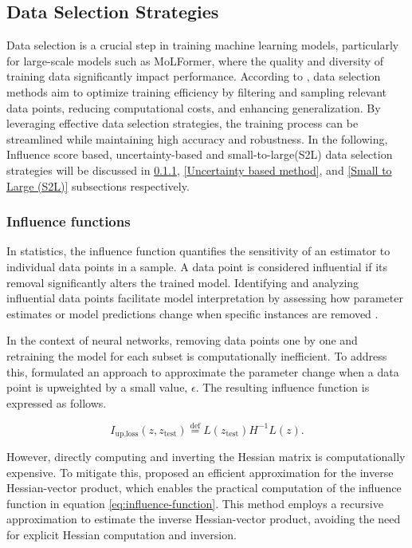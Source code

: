\documentclass[11pt]{article}
\begin{document}
\subsection{Data Selection Strategies}
\label{data-selection}
Data selection is a crucial step in training machine learning models, particularly for large-scale models such as MoLFormer, where the quality and diversity of training data significantly impact performance. According to \cite{albalak2023survey}, data selection methods aim to optimize training efficiency by filtering and sampling relevant data points, reducing computational costs, and enhancing generalization. By leveraging effective data selection strategies, the training process can be streamlined while maintaining high accuracy and robustness. In the following, Influence score based, uncertainty-based and small-to-large(S2L) data selection strategies will be discussed in \ref{Influence functions}, \ref{Uncertainty based method}, and \ref{Small to Large (S2L)} subsections respectively. 

\subsubsection{Influence functions}
\label{Influence functions}
In statistics, the influence function quantifies the sensitivity of an estimator to individual data points in a sample. A data point is considered influential if its removal significantly alters the trained model. Identifying and analyzing influential data points facilitate model interpretation by assessing how parameter estimates or model predictions change when specific instances are removed \cite{molnar2020interpretable}.

In the context of neural networks, removing data points one by one and retraining the model for each subset is computationally inefficient. To address this, \cite{koh2017understanding} formulated an approach to approximate the parameter change when a data point is upweighted by a small value, $\epsilon$. The resulting influence function is expressed as follows.

\begin{equation} I_{\text{up,loss}}(z, z_{\text{test}}) \overset{\text{def}}{=} L(z_{\text{test}}) H^{-1} L(z). \label{eq:influence-function} \end{equation}

However, directly computing and inverting the Hessian matrix is computationally expensive. To mitigate this, \cite{agarwal2017second} proposed an efficient approximation for the inverse Hessian-vector product, which enables the practical computation of the influence function in equation \eqref{eq:influence-function}. This method employs a recursive approximation to estimate the inverse Hessian-vector product, avoiding the need for explicit Hessian computation and inversion.
\end{document}
